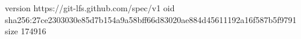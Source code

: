 version https://git-lfs.github.com/spec/v1
oid sha256:27ce2303030e85d7b154a9a58bff66d83020ae884d45611192a16f587b5f9791
size 174916

